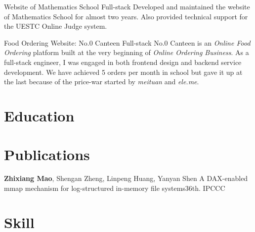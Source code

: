 \documentclass[11pt,a4paper]{moderncv}
\begin{document}
{Website of Mathematics School }
{Full-stack}
{}{}{
	Developed and maintained the website of Mathematics School for almost two years. Also provided technical support for the UESTC Online Judge system.
}

{Food Ordering Website:  No.0 Canteen }
{Full-stack}
{}{}{
	No.0 Canteen is an \textit{Online Food Ordering} platform built at the very beginning of \textit{Online Ordering Business}. As a full-stack
	engineer, I was engaged in both frontend design and backend service development. We have achieved 5 orders per month in school but gave it up at the last because of the price-war started by \textit{meituan} and \textit{ele.me}.
}

\section{Education}

\section{Publications}
{\textbf{Zhixiang Mao}\textnormal{, Shengan Zheng, Linpeng Huang, Yanyan Shen}}
{A DAX-enabled mmap mechanism for log-structured in-memory file systems}{36th. IPCCC}
{}{}{}

\section{Skill}



\end{document}
